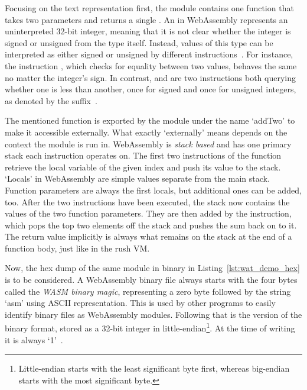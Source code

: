 
Focusing on the text representation first, the module contains one function that takes two  parameters and returns a single .
An  in WebAssembly represents an uninterpreted 32-bit integer, meaning that it is not clear whether the integer is signed or unsigned from the type itself.
Instead, values of this type can be interpreted as either signed or unsigned by different instructions~\cite[Section~2.3.1]{WasmSpec}.
For instance, the instruction , which checks for equality between two  values, behaves the same no matter the integer's sign.
In contrast,  and  are two instructions both querying whether one  is less than another, once for signed and once for unsigned integers, as denoted by the suffix~\cite[p.46]{Sendil2022-fy}.

The mentioned function is exported by the module under the name `addTwo' to make it accessible externally.
What exactly `externally' means depends on the context the module is run in.
WebAssembly is \emph{stack based} and has one primary stack each instruction operates on.
The first two instructions of the  function retrieve the local variable of the given index and push its value to the stack.
`Locals' in WebAssembly are simple values separate from the main stack.
Function parameters are always the first locals, but additional ones can be added, too.
After the two instructions have been executed, the stack now contains the values of the two function parameters.
They are then added by the  instruction, which pops the top two elements off the stack and pushes the sum back on to it.
The return value implicitly is always what remains on the stack at the end of a function body, just like in the rush VM.

Now, the hex dump of the same module in binary in Listing~\ref{lst:wat_demo_hex} is to be considered.
A WebAssembly binary file always starts with the four bytes  called the \emph{WASM binary magic}, representing a zero byte followed by the string `asm' using ASCII representation.
This is used by other programs to easily identify binary files as WebAssembly modules.
Following that is the version of the binary format, stored as a 32-bit integer in little-endian\footnote{Little-endian starts with the least significant byte first, whereas big-endian starts with the most significant byte.}.
At the time of writing it is always `1'~\cite[Section~5.5.16]{WasmSpec}.


